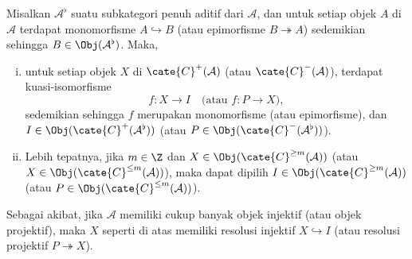 \begin{teorema}\label{prop:resolution-existence}
	Misalkan $\mathcal{A}^\flat$ suatu subkategori penuh aditif dari $\mathcal{A}$, dan untuk setiap objek $A$ di $\mathcal{A}$ terdapat monomorfisme $A \hookrightarrow B$ (atau epimorfisme $B \twoheadrightarrow A$) sedemikian sehingga $B \in \Obj(\mathcal{A}^\flat)$. Maka,
	\begin{enumerate}[(i)]
		\item untuk setiap objek $X$ di $\cate{C}^+(\mathcal{A})$ (atau $\cate{C}^-(\mathcal{A})$), terdapat kuasi-isomorfisme
		\[ f: X \to I \quad \text{(atau $f: P \to X$)}, \]
		sedemikian sehingga $f$ merupakan monomorfisme (atau epimorfisme), dan $I \in \Obj(\cate{C}^+(\mathcal{A}^\flat))$ (atau $P \in \Obj(\cate{C}^-(\mathcal{A}^\flat))$).
		\item Lebih tepatnya, jika $m \in \Z$ dan $X \in \Obj(\cate{C}^{\geq m}(\mathcal{A}))$ (atau $X \in \Obj(\cate{C}^{\leq m}(\mathcal{A}))$), maka dapat dipilih $I \in \Obj(\cate{C}^{\geq m}(\mathcal{A}))$ (atau $P \in \Obj(\cate{C}^{\leq m}(\mathcal{A}))$).
	\end{enumerate}

	Sebagai akibat, jika $\mathcal{A}$ memiliki cukup banyak objek injektif (atau objek projektif), maka $X$ seperti di atas memiliki resolusi injektif $X \hookrightarrow I$ (atau resolusi projektif $P \twoheadrightarrow X$).
\end{teorema}
